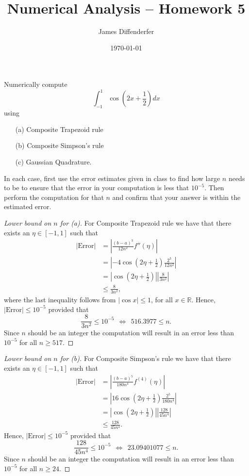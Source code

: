 \documentclass[8pt]{article}
\title{Numerical Analysis -- Homework 5}
\author{James Diffenderfer}
\date{\today}
\theoremstyle{definition}
\newenvironment{exercise}[1]
  {\renewcommand\theinnerexercise{#1}\innerexercise}
  {\endinnerexercise}
\begin{document}
\maketitle


\begin{exercise}{1}
Numerically compute $$\int_{-1}^{1} \cos \left( 2x + \frac{1}{2} \right) dx$$ using
\begin{enumerate}
	\item [(a)] Composite Trapezoid rule
	\item [(b)] Composite Simpson's rule
	\item [(c)] Gaussian Quadrature.
\end{enumerate}
In each case, first use the error estimates given in class to find how large $n$ needs to be to ensure that the error in your computation is less that $10^{-5}$. Then perform the computation for that $n$ and confirm that your answer is within the estimated error.
\end{exercise}

\begin{proof}[Lower bound on $n$ for (a)]
For Composite Trapezoid rule we have that there exists an $\eta \in [-1, 1]$ such that
\begin{align*}
\left| \text{Error} \right| &= \left| \frac{(b - a)^3}{12 n^2} f''(\eta) \right| \\
&= \left| -4 \cos \left( 2 \eta + \frac{1}{2} \right) \frac{2^3}{12 n^2} \right| \\
&= \left| \cos \left( 2 \eta + \frac{1}{2} \right) \right| \left| \frac{8}{3 n^2} \right| \\
&\leq \frac{8}{3 n^2},
\end{align*}
where the last inequality follows from $| \cos x | \leq 1$, for all $x \in \mathbb{R}$. Hence, $| \text{Error} | \leq 10^{-5}$ provided that $$\frac{8}{3 n^2} \leq 10^{-5} \ \ \Longleftrightarrow \ \ 516.3977 \leq n.$$ Since $n$ should be an integer the computation will result in an error less than $10^{-5}$ for all $n \geq 517$.
\end{proof}

\begin{proof}[Lower bound on $n$ for (b)]
For Composite Simpson's rule we have that there exists an $\eta \in [-1, 1]$ such that
\begin{align*}
\left| \text{Error} \right| &= \left| \frac{(b - a)^5}{180 n^4} f^{(4)} (\eta) \right| \\
&= \left| 16 \cos \left( 2 \eta + \frac{1}{2} \right) \frac{2^5}{180 n^4} \right| \\
&= \left| \cos \left( 2 \eta + \frac{1}{2} \right) \right| \left| \frac{128}{45 n^4} \right| \\
&\leq \frac{128}{45 n^4}.
\end{align*}
Hence, $| \text{Error} | \leq 10^{-5}$ provided that $$\frac{128}{45 n^4} \leq 10^{-5} \ \ \Longleftrightarrow \ \ 23.09401077 \leq n.$$ Since $n$ should be an integer the computation will result in an error less than $10^{-5}$ for all $n \geq 24$.
\end{proof}
\end{document}
